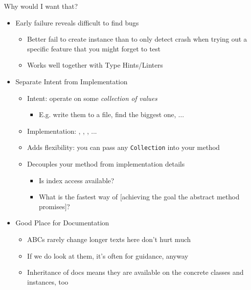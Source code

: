 \begin{frame}{Why would I want that?}
%
\begin{itemize}
\item Early failure reveals difficult to find bugs
	\begin{itemize}
	\item Better fail to create instance than to only detect crash when trying out a specific feature that you might forget to test
	\item Works well together with Type Hints/Linters
	\end{itemize}
	\pause
\item Separate Intent from Implementation
	\begin{itemize}
	\item Intent: operate on some \emph{collection of values} \Thus {}
		\begin{itemize}
		\item E.\;g. write them to a file, find the biggest one, ...
		\end{itemize}
	\item Implementation: , , , ...
	\item[\Thus] Adds flexibility: you can pass any \texttt{Collection} into your method
	\item[\Thus] Decouples your method from implementation details
		\begin{itemize}
		\item Is index access available?
		\item What is the fastest way of [achieving the goal the abstract method promises]?
		\end{itemize}
	\end{itemize}
	\pause
\item Good Place for Documentation
	\begin{itemize}
	\item ABCs rarely change \Thus longer texts here don't hurt much
	\item If we do look at them, it's often for guidance, anyway
	\item Inheritance of docs means they are available on the concrete classes and instances, too
	\end{itemize}
\end{itemize}
%
\end{frame}


